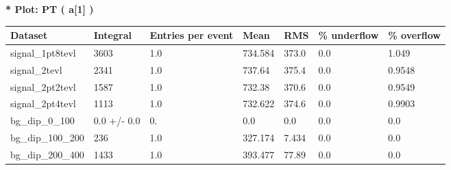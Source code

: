 \documentclass[a4paper, 10pt]{article}
\begin{document}
\textbf{* Plot: PT ( a[1] ) }\\
   \begin{table}[H]
  \begin{center}
    \begin{tabular}{|m{23.0mm}|m{23.0mm}|m{18.0mm}|m{19.0mm}|m{19.0mm}|m{19.0mm}|m{19.0mm}|}
      \hline
      {\cellcolor{yellow}         Dataset}& {\cellcolor{yellow}         Integral}& {\cellcolor{yellow}         Entries per event}& {\cellcolor{yellow}         Mean}& {\cellcolor{yellow}         RMS}& {\cellcolor{yellow}         \% underflow}& {\cellcolor{yellow}         \% overflow}\\
      \hline
      {\cellcolor{white}         signal\_1pt8tevl}& {\cellcolor{white}         3603}& {\cellcolor{white}         1.0}& {\cellcolor{white}         734.584}& {\cellcolor{white}         373.0}& {\cellcolor{green}         0.0}& {\cellcolor{green}         1.049}\\
      \hline
      {\cellcolor{white}         signal\_2tevl}& {\cellcolor{white}         2341}& {\cellcolor{white}         1.0}& {\cellcolor{white}         737.64}& {\cellcolor{white}         375.4}& {\cellcolor{green}         0.0}& {\cellcolor{green}         0.9548}\\
      \hline
      {\cellcolor{white}         signal\_2pt2tevl}& {\cellcolor{white}         1587}& {\cellcolor{white}         1.0}& {\cellcolor{white}         732.38}& {\cellcolor{white}         370.6}& {\cellcolor{green}         0.0}& {\cellcolor{green}         0.9549}\\
      \hline
      {\cellcolor{white}         signal\_2pt4tevl}& {\cellcolor{white}         1113}& {\cellcolor{white}         1.0}& {\cellcolor{white}         732.622}& {\cellcolor{white}         374.6}& {\cellcolor{green}         0.0}& {\cellcolor{green}         0.9903}\\
      \hline
      {\cellcolor{white}         bg\_dip\_0\_100}& {\cellcolor{white}         0.0 +/\-- 0.0}& {\cellcolor{white}         0.}& {\cellcolor{white}         0.0}& {\cellcolor{white}         0.0}& {\cellcolor{green}         0.0}& {\cellcolor{green}         0.0}\\
      \hline
      {\cellcolor{white}         bg\_dip\_100\_200}& {\cellcolor{white}         236}& {\cellcolor{white}         1.0}& {\cellcolor{white}         327.174}& {\cellcolor{white}         7.434}& {\cellcolor{green}         0.0}& {\cellcolor{green}         0.0}\\
      \hline
      {\cellcolor{white}         bg\_dip\_200\_400}& {\cellcolor{white}         1433}& {\cellcolor{white}         1.0}& {\cellcolor{white}         393.477}& {\cellcolor{white}         77.89}& {\cellcolor{green}         0.0}& {\cellcolor{green}         0.0}\\

\end{tabular}
\end{center}
\end{table}
\end{document}
